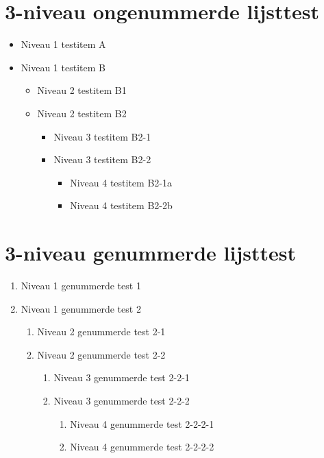 \documentclass[nl]{../../elegantbook}
\begin{document}
\section{3-niveau ongenummerde lijsttest}
\begin{itemize}
\item Niveau 1 testitem A
\item Niveau 1 testitem B
    \begin{itemize}
    \item Niveau 2 testitem B1
    \item Niveau 2 testitem B2
        \begin{itemize}
        \item Niveau 3 testitem B2-1
        \item Niveau 3 testitem B2-2
            \begin{itemize}
            \item Niveau 4 testitem B2-1a
            \item Niveau 4 testitem B2-2b
            \end{itemize}
        \end{itemize}
    \end{itemize}
\end{itemize}

\section{3-niveau genummerde lijsttest}
\begin{enumerate}
\item Niveau 1 genummerde test 1
\item Niveau 1 genummerde test 2
    \begin{enumerate}
    \item Niveau 2 genummerde test 2-1
    \item Niveau 2 genummerde test 2-2
        \begin{enumerate}
        \item Niveau 3 genummerde test 2-2-1
        \item Niveau 3 genummerde test 2-2-2
            \begin{enumerate}
            \item Niveau 4 genummerde test 2-2-2-1
            \item Niveau 4 genummerde test 2-2-2-2
            \end{enumerate}
        \end{enumerate}
    \end{enumerate}
\end{enumerate}
\end{document}

